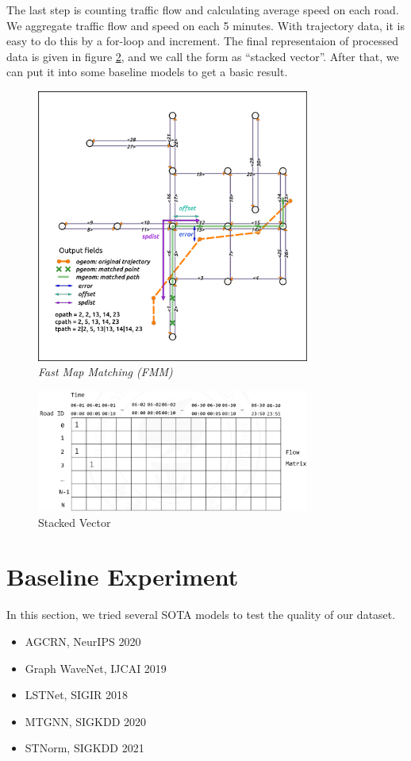 \documentclass[fontset=none]{ctexart}
\theoremstyle{definition}
\theoremstyle{remark}
\begin{document}
The last step is counting traffic flow and calculating average speed on each road.
We aggregate traffic flow and speed on each 5 minutes.
With trajectory data, it is easy to do this by a for-loop and increment.
The final representaion of processed data is given in figure \ref{fig: 2-9}, and we call the form
as ``stacked vector''\cite{lee2021short}. After that, we can put it into some baseline models to get a basic result.

\clearpage
\begin{figure}[t]
  \centering
  \includegraphics[width=0.8\textwidth]{images/mid/2-8.png}
  \caption{\textit{Fast Map Matching (FMM)}}
  \label{fig: 2-8}
\end{figure}

\begin{figure}[b]
  \centering
  \includegraphics[width=0.8\textwidth]{images/mid/2-9.png}
  \caption{Stacked Vector}
  \label{fig: 2-9}
\end{figure}

\clearpage
\section{Baseline Experiment}
In this section, we tried several SOTA models to test the quality of our dataset.
\begin{itemize}
  \item AGCRN, NeurIPS 2020\cite{bai2020adaptive}
  \item Graph WaveNet, IJCAI 2019\cite{wu2019graph}
  \item LSTNet, SIGIR 2018\cite{lai2018modeling}
  \item MTGNN, SIGKDD 2020\cite{wu2020connecting}
  \item STNorm, SIGKDD 2021\cite{deng2021st}
\end{itemize}
\end{document}

